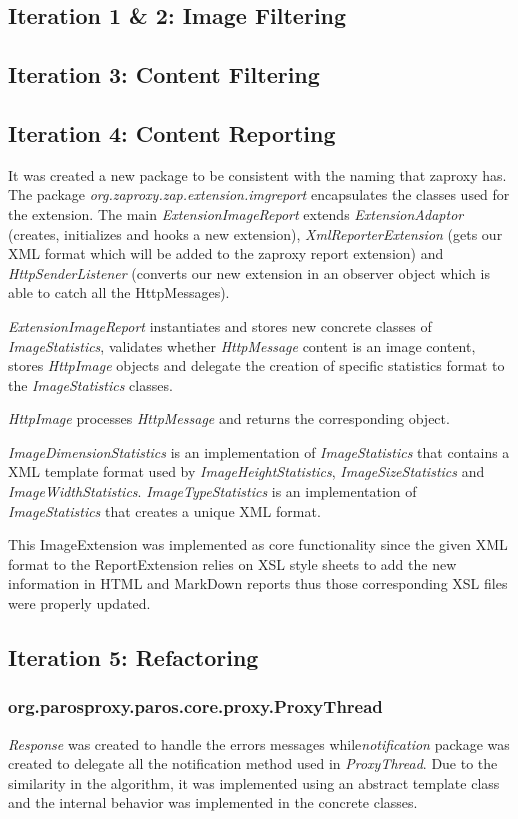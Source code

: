 \subsection{Iteration 1 \& 2: Image Filtering}
\subsection{Iteration 3: Content Filtering}
\subsection{Iteration 4: Content Reporting}
It was created a new package to be consistent with the naming that zaproxy has. The package \textit{org.zaproxy.zap.extension.imgreport} encapsulates the classes used for the extension. The main \textit{ExtensionImageReport} extends \textit{ExtensionAdaptor} (creates, initializes and hooks a new extension), \textit{XmlReporterExtension} (gets our XML format which will be added to the zaproxy report extension) and \textit{HttpSenderListener} (converts our new extension in an observer object which is able to catch all the HttpMessages).
\par
\textit{ExtensionImageReport} instantiates and stores new concrete classes of \textit{ImageStatistics}, validates whether \textit{HttpMessage} content is an image content, stores \textit{HttpImage} objects and delegate the creation of specific statistics format to the \textit{ImageStatistics} classes. 
\par
\textit{HttpImage} processes \textit{HttpMessage} and returns the corresponding object.
\par
\textit{ImageDimensionStatistics} is an implementation of \textit{ImageStatistics} that contains a XML template format used by \textit{ImageHeightStatistics}, \textit{ImageSizeStatistics} and \textit{ImageWidthStatistics}. \textit{ImageTypeStatistics} is an implementation of \textit{ImageStatistics} that creates a unique XML format.
\par
This ImageExtension was implemented as core functionality since the given XML format to the ReportExtension relies on XSL style sheets to add the new information in HTML and MarkDown reports thus those corresponding XSL files were properly updated.

\subsection{Iteration 5: Refactoring}
\subsubsection{org.parosproxy.paros.core.proxy.ProxyThread}

\textit{Response} was created to handle the errors messages while\textit{notification} package was created to delegate all the notification method used in \textit{ProxyThread}. Due to the similarity in the algorithm, it was implemented using an abstract template class and the internal behavior was implemented in the concrete classes.
